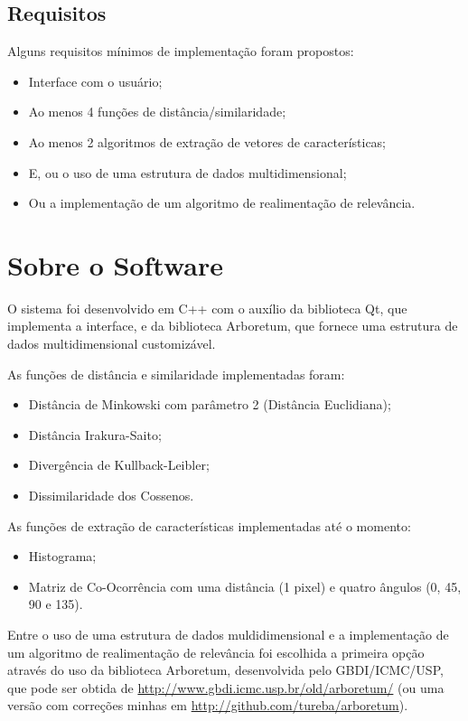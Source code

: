 \documentclass[10pt,a4paper]{article}
\begin{document}
\begin{titlepage}
\begin{multicols}{2}
\subsection{Requisitos}

Alguns requisitos mínimos de implementação foram propostos:

\begin{itemize}
	\item Interface com o usuário;
	\item Ao menos 4 funções de distância/similaridade;
	\item Ao menos 2 algoritmos de extração de vetores de características;
	\item E, ou o uso de uma estrutura de dados multidimensional;
	\item Ou a implementação de um algoritmo de realimentação de relevância.
\end{itemize}


\section{Sobre o Software}

O sistema foi desenvolvido em C++ com o auxílio da biblioteca Qt\cite{qt4},
que implementa a interface, e da biblioteca Arboretum\cite{arboretum}, que
fornece uma estrutura de dados multidimensional customizável.

As funções de distância e similaridade implementadas foram:
\begin{itemize}
	\item Distância de Minkowski com parâmetro 2 (Distância Euclidiana);
	\item Distância Irakura-Saito;
	\item Divergência de Kullback-Leibler;
	\item Dissimilaridade dos Cossenos.
\end{itemize}

As funções de extração de características implementadas até o momento:
\begin{itemize}
	\item Histograma;
	\item Matriz de Co-Ocorrência com uma distância (1 pixel) e quatro
		ângulos (0, 45, 90 e 135).
\end{itemize}

Entre o uso de uma estrutura de dados muldidimensional e a implementação de
um algoritmo de realimentação de relevância foi escolhida a primeira opção
através do uso da biblioteca Arboretum\cite{arboretum}, desenvolvida pelo GBDI/ICMC/USP,
que pode ser obtida de \url{http://www.gbdi.icmc.usp.br/old/arboretum/} (ou uma versão
com correções minhas em \url{http://github.com/tureba/arboretum}).


\end{multicols}
\end{titlepage}
\end{document}
